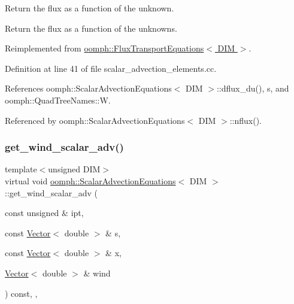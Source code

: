 Return the flux as a function of the unknown. 

Return the flux as a function of the unknowns. 

Reimplemented from \hyperlink{classoomph_1_1FluxTransportEquations_ab6ed40337620462e5c6e992081c1612a}{oomph\+::\+Flux\+Transport\+Equations$<$ D\+I\+M $>$}.



Definition at line 41 of file scalar\+\_\+advection\+\_\+elements.\+cc.



References oomph\+::\+Scalar\+Advection\+Equations$<$ D\+I\+M $>$\+::dflux\+\_\+du(), s, and oomph\+::\+Quad\+Tree\+Names\+::W.



Referenced by oomph\+::\+Scalar\+Advection\+Equations$<$ D\+I\+M $>$\+::nflux().

\mbox{\label{classoomph_1_1ScalarAdvectionEquations_ae3a022b75a6f2c343c18a938ee3fb457}} 
\subsubsection{\texorpdfstring{get\+\_\+wind\+\_\+scalar\+\_\+adv()}{get\_wind\_scalar\_adv()}}
{\footnotesize\ttfamily template$<$unsigned D\+IM$>$ \\
virtual void \hyperlink{classoomph_1_1ScalarAdvectionEquations}{oomph\+::\+Scalar\+Advection\+Equations}$<$ D\+IM $>$\+::get\+\_\+wind\+\_\+scalar\+\_\+adv (\begin{DoxyParamCaption}\item[{const unsigned \&}]{ipt,  }\item[{const \hyperlink{classoomph_1_1Vector}{Vector}$<$ double $>$ \&}]{s,  }\item[{const \hyperlink{classoomph_1_1Vector}{Vector}$<$ double $>$ \&}]{x,  }\item[{\hyperlink{classoomph_1_1Vector}{Vector}$<$ double $>$ \&}]{wind }\end{DoxyParamCaption}) const\hspace{0.3cm}{\ttfamily [inline]}, {\ttfamily [protected]}, {\ttfamily [virtual]}}



